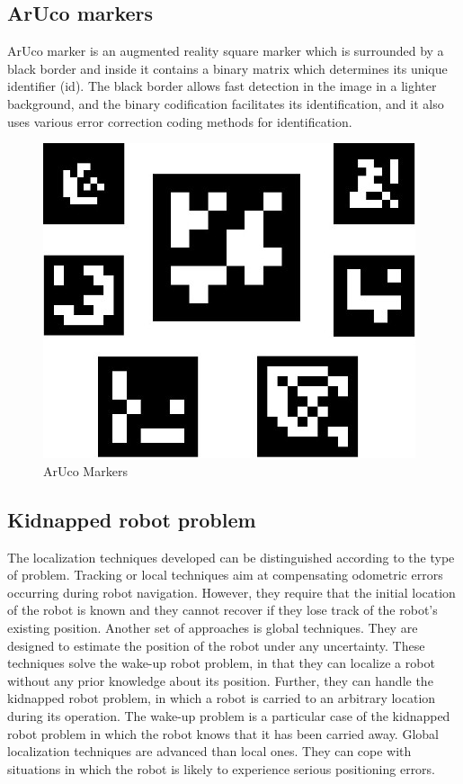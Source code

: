 \documentclass[12pt]{article}
\begin{document}
 
\subsection{ArUco markers}
ArUco marker is an augmented reality square marker which is surrounded by a black border and inside it contains a binary matrix which determines its unique identifier (id). The black border allows fast detection in the image in a lighter background, and the binary codification facilitates its identification, and it also uses various error correction coding methods for identification.

\begin{figure}[H]
\centering
\includegraphics[scale=0.4]{markers.jpg}
\caption{ArUco Markers}
\end{figure}
 
 \subsection{Kidnapped robot problem}
The localization techniques developed can be distinguished according to the type of problem. Tracking or local techniques aim at compensating odometric errors occurring during robot navigation. However, they require that the initial location of the robot is known and they cannot recover if they lose track of the robot's existing position. Another set of approaches is global techniques. They are designed to estimate the position of the robot under any uncertainty. These techniques solve the wake-up robot problem, in that they can localize a robot without any prior knowledge about its position. Further, they can handle the kidnapped robot problem, in which a robot is carried to an arbitrary location during its operation. The wake-up problem is a particular case of the kidnapped robot problem in which the robot knows that it has been carried away. Global localization techniques are advanced than local ones. They can cope with situations in which the robot is likely to experience serious positioning errors.
 
\end{document}
